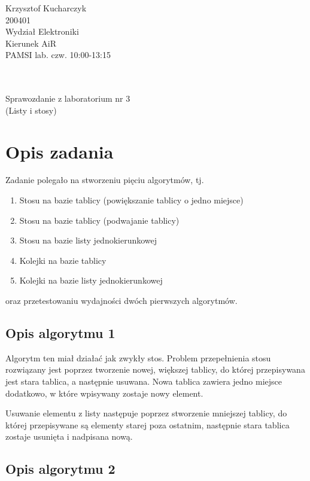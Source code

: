 \documentclass[a4paper,12pt]{article}
\begin{document}
Krzysztof Kucharczyk\\200401\\Wydział Elektroniki\\Kierunek AiR
\\PAMSI lab. czw. 10:00-13:15\\\\\\
\begin{center} 
Sprawozdanie z laboratorium nr 3\\(Listy i stosy)
\end{center}

\section{Opis zadania}

Zadanie polegało na stworzeniu pięciu algorytmów, tj. 
\begin{enumerate} 
\item Stosu na bazie tablicy (powiększanie tablicy o jedno miejsce)
\item Stosu na bazie tablicy (podwajanie tablicy)
\item Stosu na bazie listy jednokierunkowej
\item Kolejki na bazie tablicy
\item Kolejki na bazie listy jednokierunkowej

\end{enumerate}

oraz przetestowaniu wydajności dwóch pierwszych algorytmów.

\subsection{Opis algorytmu 1}

Algorytm ten miał działać jak zwykły stos. Problem przepełnienia stosu 
rozwiązany jest poprzez tworzenie nowej, większej tablicy, do której 
przepisywana jest stara tablica, a następnie usuwana. Nowa tablica zawiera
jedno miejsce dodatkowo, w które wpisywany zostaje nowy element.

Usuwanie elementu z listy następuje poprzez stworzenie mniejszej tablicy, 
do której przepisywane są elementy starej poza ostatnim, następnie stara
tablica zostaje usunięta i nadpisana nową.

\subsection{Opis algorytmu 2}
\end{document}
